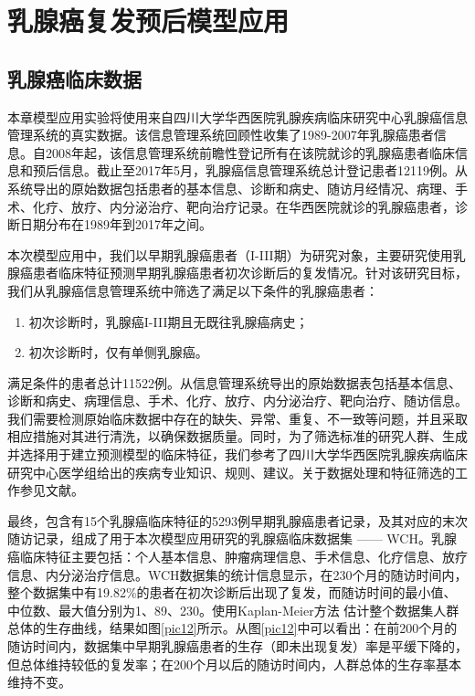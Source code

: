 \chapter{乳腺癌复发预后模型应用}

\section{乳腺癌临床数据}
本章模型应用实验将使用来自四川大学华西医院乳腺疾病临床研究中心乳腺癌信息管理系统的真实数据。该信息管理系统回顾性收集了1989-2007年乳腺癌患者信息。自2008年起，该信息管理系统前瞻性登记所有在该院就诊的乳腺癌患者临床信息和预后信息。截止至2017年5月，乳腺癌信息管理系统总计登记患者12119例。从系统导出的原始数据包括患者的基本信息、诊断和病史、随访月经情况、病理、手术、化疗、放疗、内分泌治疗、靶向治疗记录。在华西医院就诊的乳腺癌患者，诊断日期分布在1989年到2017年之间。

本次模型应用中，我们以早期乳腺癌患者（I-III期）为研究对象，主要研究使用乳腺癌患者临床特征预测早期乳腺癌患者初次诊断后的复发情况。针对该研究目标，我们从乳腺癌信息管理系统中筛选了满足以下条件的乳腺癌患者：
\begin{enumerate}
	\item 初次诊断时，乳腺癌I-III期且无既往乳腺癌病史；
	\item 初次诊断时，仅有单侧乳腺癌。
\end{enumerate}
满足条件的患者总计11522例。从信息管理系统导出的原始数据表包括基本信息、诊断和病史、病理信息、手术、化疗、放疗、内分泌治疗、靶向治疗、随访信息。我们需要检测原始临床数据中存在的缺失、异常、重复、不一致等问题，并且采取相应措施对其进行清洗，以确保数据质量。同时，为了筛选标准的研究人群、生成并选择用于建立预测模型的临床特征，我们参考了四川大学华西医院乳腺疾病临床研究中心医学组给出的疾病专业知识、规则、建议。关于数据处理和特征筛选的工作参见文献\cite{fu2018tbme}。

最终，包含有15个乳腺癌临床特征的5293例早期乳腺癌患者记录，及其对应的末次随访记录，组成了用于本次模型应用研究的乳腺癌临床数据集 —— WCH。乳腺癌临床特征主要包括：个人基本信息、肿瘤病理信息、手术信息、化疗信息、放疗信息、内分泌治疗信息。WCH数据集的统计信息显示，在230个月的随访时间内，整个数据集中有19.82\%的患者在初次诊断后出现了复发，而随访时间的最小值、中位数、最大值分别为1、89、230。使用Kaplan-Meier方法 估计整个数据集人群总体的生存曲线，结果如图\ref{pic12}所示。从图\ref{pic12}中可以看出：在前200个月的随访时间内，数据集中早期乳腺癌患者的生存（即未出现复发）率是平缓下降的，但总体维持较低的复发率；在200个月以后的随访时间内，人群总体的生存率基本维持不变。

